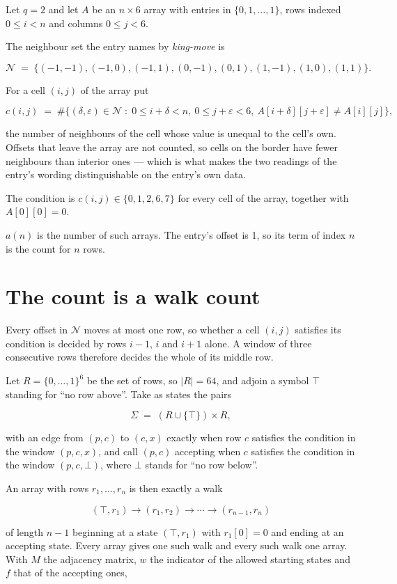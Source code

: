 \documentclass[11pt]{article}
\theoremstyle{definition}
\begin{document}
Let $q = 2$ and let $A$ be an $n \times 6$ array with entries in $\{0,1,\dots,1\}$, rows indexed $0 \le i < n$ and columns $0 \le j < 6$.

The neighbour set the entry names by {\itshape king-move} is

\[\mathcal{N} \;=\; \{(-1,-1), (-1,0), (-1,1), (0,-1), (0,1), (1,-1), (1,0), (1,1)\}.\]

For a cell $(i,j)$ of the array put

\[c(i,j) \;=\; \#\bigl\{(\delta,\varepsilon)\in\mathcal{N} \;:\; 0\le i+\delta<n,\ 0\le j+\varepsilon<6,\ A[i+\delta][j+\varepsilon] \neq A[i][j]\bigr\},\]

the number of neighbours of the cell whose value is unequal to the cell's own. Offsets that leave the array are not counted, so cells on the border have fewer neighbours than interior ones --- which is what makes the two readings of the entry's wording distinguishable on the entry's own data.

The condition is $c(i,j) \in \{0, 1, 2, 6, 7\}$ for every cell of the array, together with $A[0][0]=0$.

$a(n)$ is the number of such arrays. The entry's offset is 1, so its term of index $n$ is the count for $n$ rows.

\section{The count is a walk count}

Every offset in $\mathcal{N}$ moves at most one row, so whether a cell $(i,j)$ satisfies its condition is decided by rows $i-1$, $i$ and $i+1$ alone. A window of three consecutive rows therefore decides the whole of its middle row.

Let $R = \{0,\dots,1\}^{6}$ be the set of rows, so $|R| = 64$, and adjoin a symbol $\top$ standing for ``no row above''. Take as states the pairs

\[\Sigma \;=\; (R \cup \{\top\}) \times R,\]

with an edge from $(p,c)$ to $(c,x)$ exactly when row $c$ satisfies the condition in the window $(p,c,x)$, and call $(p,c)$ accepting when $c$ satisfies the condition in the window $(p,c,\bot)$, where $\bot$ stands for ``no row below''.

An array with rows $r_1,\dots,r_n$ is then exactly a walk

\[(\top,r_1) \to (r_1,r_2) \to \cdots \to (r_{n-1},r_n)\]

of length $n-1$ beginning at a state $(\top,r_1)$ with $r_1[0]=0$ and ending at an accepting state. Every array gives one such walk and every such walk one array. With $M$ the adjacency matrix, $w$ the indicator of the allowed starting states and $f$ that of the accepting ones,
\end{document}
